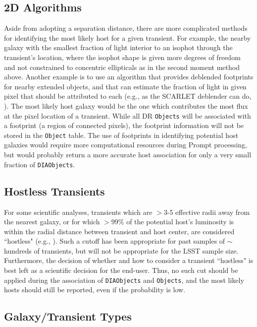 \documentclass[DM,lsstdraft,authoryear,toc]{lsstdoc}
\begin{document}
\subsection{2D Algorithms}

Aside from adopting a separation distance, there are more complicated methods for identifying the most likely host for a given transient.
For example, the nearby galaxy with the smallest fraction of light interior to an isophot through the transient's location, where the isophot shape is given more degrees of freedom and not constrained to concentric ellipticals as in the second moment method above.
Another example is to use an algorithm that provides deblended footprints for nearby extended objects, and that can estimate the fraction of light in given pixel that should be attributed to each (e.g., as the SCARLET deblender can do, \cite{2018A&C....24..129M}).
The most likely host galaxy would be the one which contributes the most flux at the pixel location of a transient.
While all DR {\tt Objects} will be associated with a footprint (a region of connected pixels), the footprint information will not be stored in the {\tt Object} table.
The use of footprints in identifying potential host galaxies would require more computational resources during Prompt processing, but would probably return a more accurate host association for only a very small fraction of {\tt DIAObjects}. 

\subsection{Hostless Transients}

For some scientific analyses, transients which are $>$3-5 effective radii away from the nearest galaxy, or for which $>99\%$ of the potential host's luminosity is within the radial distance between transient and host center, are considered ``hostless" (e.g., \citealt{2011ApJ...729..142S}).
Such a cutoff has been appropriate for past samples of $\sim$hundreds of transients, but will not be appropriate for the LSST sample size.
Furthermore, the decision of whether and how to consider a transient ``hostless" is best left as a scientific decision for the end-user.
Thus, no such cut should be applied during the association of {\tt DIAObjects} and {\tt Objects}, and the most likely hosts should still be reported, even if the probability is low.

\subsection{Galaxy/Transient Types}
\end{document}
